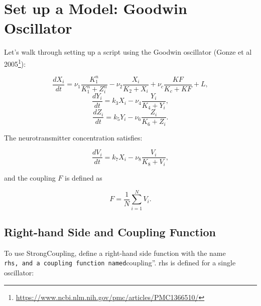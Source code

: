 \documentclass[english,a4paper,oneside]{article}
\DeclareRobustCommand{\href}[2]{#2\footnote{\url{#1}}}
\begin{document}
\hypertarget{set-up-a-model-goodwin-oscillator}{%
\section{Set up a Model: Goodwin
Oscillator}\label{set-up-a-model-goodwin-oscillator}}

Let's walk through setting up a script using the Goodwin oscillator
(\href{https://www.ncbi.nlm.nih.gov/pmc/articles/PMC1366510/}{Gonze et
al 2005}):

\[\frac{dX_i}{dt} = \nu_1 \frac{K_1^n}{K_1^n+Z_i^n} - \nu_2 \frac{X_i}{K_2 + X_i}+ \nu_c \frac{KF}{K_c + KF} + L,\]
\[\frac{dY_i}{dt} = k_3 X_i - \nu_4 \frac{Y_i}{K_4 + Y_i},\]
\[\frac{dZ_i}{dt} = k_5 Y_i - \nu_6 \frac{Z_i}{K_6 + Z_i}.\]

The neurotransmitter concentration satisfies:

\[\frac{dV_i}{dt} = k_7 X_i - \nu_8 \frac{V_i}{K_8 + V_i},\]

and the coupling \(F\) is defined as

\[F = \frac{1}{N}\sum_{i=1}^N V_i.\]

\hypertarget{right-hand-side-and-coupling-function}{%
\subsection{Right-hand Side and Coupling
Function}\label{right-hand-side-and-coupling-function}}

To use StrongCoupling, define a right-hand side function with the name
\texttt{rhs\textquotesingle{}\textquotesingle{},\ and\ a\ coupling\ function\ named}coupling''.
rhs is defined for a single oscillator:
\end{document}
